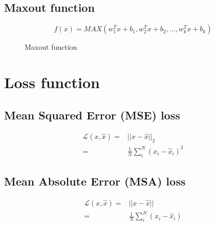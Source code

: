 \subsection{Maxout function}
\begin{equation}
    f(x) = MAX(w^{T}_{1}x + b_{1},w^{T}_{2}x + b_{2},...,w^{T}_{k}x + b_{k})
\end{equation}

\begin{figure}[H]
    \centering
    \caption{Maxout function}
\end{figure}

\section{Loss function}
\subsection{Mean Squared Error (MSE) loss}
\begin{equation}
    \begin{aligned}
    \mathcal{L}(x,\hat{x}) =& || x - \hat{x} ||_{2}\\
                           =& \frac{1}{N}\sum^{N}_{i} (x_{i} - \hat{x}_{i})^{2} 
    \end{aligned}
\end{equation}
\subsection{Mean Absolute Error (MSA) loss}
\begin{equation}
    \begin{aligned}
    \mathcal{L}(x,\hat{x}) =& || x - \hat{x} ||\\
                           =& \frac{1}{N}\sum^{N}_{i} (x_{i} - \hat{x}_{i}) 
    \end{aligned}
\end{equation}
